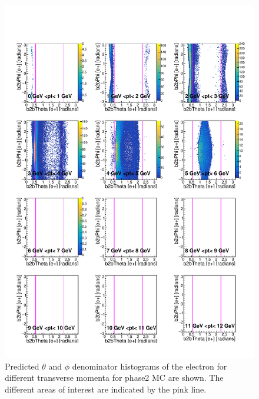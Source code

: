 \documentclass[a4paper,11pt,twosided,final,german,openbib,pdftex,listof=totoc,bibliography=totoc]{scrbook}
\begin{document}
\begin{figure}[h!]
	\includegraphics[width=\textwidth]{Plots/master/RTPtMemD_MC.pdf}
	\caption[Denominator $\theta$-$\phi$ Electron Transverse Momentum MC]{Predicted $\theta$ and $\phi$ denominator histograms of the electron for different transverse momenta for phase2 MC are shown. The different areas of interest are indicated by the pink line.
}
	\label{plt:RTPtMemD_MC}
\end{figure}
\end{document}
